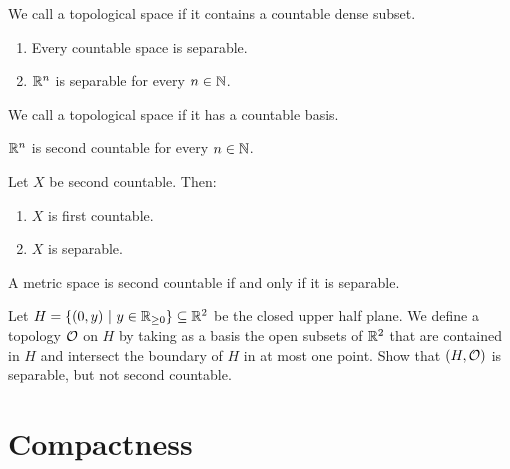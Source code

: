 \begin{importantdefinition}{}{}
	We call a topological space  if it contains a countable dense subset.
\end{importantdefinition}
\begin{exercise}
	\phantom{}
	\begin{enumerate}
		\item Every countable space is separable.
		\item $\mathbb{R}^n$ is separable for every $n \in \mathbb{N}$.
	\end{enumerate}
\end{exercise}
\begin{importantdefinition}{}{}
	We call a topological space  if it has a countable basis.
\end{importantdefinition}
\begin{exercise}
	$\mathbb{R}^n$ is second countable for every $n \in \mathbb{N}$.
\end{exercise}
\begin{exercise}
	Let $X$ be second countable. Then:
	\begin{enumerate}
		\item $X$ is first countable.
		\item $X$ is separable.
	\end{enumerate}
\end{exercise}
\begin{theorem}
	A metric space is second countable if and only if it is separable.
\end{theorem}
\begin{exercise}
	Let $H = \qty{(0,y) ~\middle|~y \in \mathbb{R}_{\geq 0}} \subseteq \mathbb{R}^2$ be the closed upper half plane. We define a topology $\mathcal{O}$ on $H$ by taking as a basis the open subsets of $\mathbb{R}^2$ that are contained in $H$ and intersect the boundary of $H$ in at most one point. Show that $(H, \mathcal{O})$ is separable, but not second countable.
\end{exercise}
\clearpage

\chapter{Compactness}

